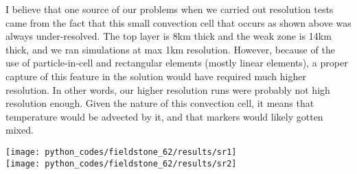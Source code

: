 I believe that one source of our problems when we carried out resolution tests
came from the fact that this small convection cell that occurs as shown above was
always under-resolved. The top layer is 8km thick and the weak zone is 14km thick,
and we ran simulations at max 1km resolution. However, because of the use  
of particle-in-cell and rectangular elements (mostly linear elements), 
a proper capture of this feature in the solution would have required much higher 
resolution. In other words, our higher resolution runs were probably not high resolution enough.
Given the nature of this convection cell, it means that temperature would be advected by it, 
and that markers would likely gotten mixed. 

\newpage
\begin{center}
\texttt{[image: python\_codes/fieldstone\_62/results/sr1]}\\
\texttt{[image: python\_codes/fieldstone\_62/results/sr2]}
\end{center}



